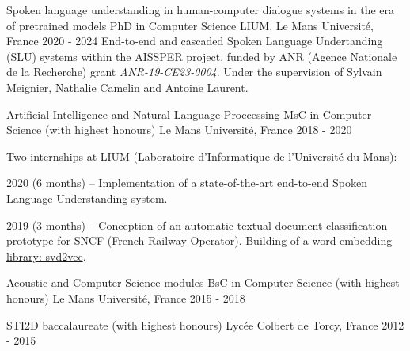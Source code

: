 
\begin{cventries}
	\cventry
		{Spoken language understanding in human-computer dialogue systems in the era of pretrained models}
		{PhD in Computer Science}
		{LIUM, Le Mans Université, France}
		{2020 - 2024}
		{End-to-end and cascaded Spoken Language Undertanding (SLU) systems within the AISSPER project, funded by ANR (Agence Nationale de la Recherche) grant \textit{ANR-19-CE23-0004}. Under the supervision of Sylvain Meignier, Nathalie Camelin and Antoine Laurent.}

	\cventry
		{Artificial Intelligence and Natural Language Proccessing}
		{MsC in Computer Science \normalfont (with highest honours)}
		{Le Mans Université, France}
		{2018 - 2020}
		{
			Two internships at LIUM (Laboratoire d'Informatique de l'Université du Mans):
			\vspace{0.5cm}
			\begin{cvitems}
				\item {2020 (6 months) -- Implementation of a state-of-the-art end-to-end Spoken Language Understanding system.}
				\item {2019 (3 months) -- Conception of an automatic textual document classification prototype for SNCF (French Railway Operator). Building of a \href{https://github.com/valentinp72/svd2vec}{word embedding library: svd2vec}.}
			\end{cvitems}
		}

	\cventry
		{Acoustic and Computer Science modules}
		{BsC in Computer Science \normalfont (with highest honours)}
		{Le Mans Université, France}
		{2015 - 2018}
		{}

	\cventry
		{}
		{STI2D baccalaureate \normalfont (with highest honours)}
		{Lycée Colbert de Torcy, France}
		{2012 - 2015}
		{}	

\end{cventries}


